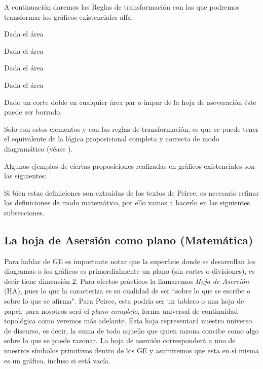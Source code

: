 \documentclass[
	fontsize=10pt, %
	twoside=false, %
	secnumdepth=1, %
	abstract=true, %
]{kaohandt}
\begin{document}
A continuación daremos las Reglas de transformación con las que podremos transformar los gráficos existenciales alfa:

\begin{definition}
	Dada el área
\end{definition}

\begin{definition}
	Dada el área
\end{definition}

\begin{definition}
	Dada el área
\end{definition}

\begin{definition}
	Dada el área
\end{definition}

\begin{definition}
	Dado un corte doble en cualquier área par o impar de la hoja de aseveración éste puede ser borrado.
\end{definition}

Solo con estos elementos y con las reglas de transformación, es que se puede tener el equivalente de la lógica proposicional completa y correcta de modo diagramático (véase ).

Algunos ejemplos de ciertas proposiciones realizadas en gráficos existenciales son las siguientes:



Si bien estas definiciones son extraídas de los textos de Peirce, es necesario refinar las definiciones de modo matemático, por ello vamos a hacerlo en las siguientes subsecciones.


\subsection{La hoja de Asersión como plano (Matemática)}

Para hablar de GE es importante notar que la superficie donde se desarrollan los diagramas o los gráficos es primordialmente un plano (sin cortes o divisiones), es decir tiene dimensión 2. Para efectos prácticos la llamaremos \textit{Hoja de Aserción} (HA), pues lo que la caracteriza es su cualidad de ser ``sobre lo que se escribe o sobre lo que se afirma". Para Peirce, esta podría ser un tablero o una hoja de papel; para nosotros será el \emph{plano complejo}, forma universal de continuidad topológica como veremos más adelante. Esta hoja representará nuestro universo de discurso, es decir, la suma de todo aquello que quien razona concibe como algo sobre lo que se puede razonar. La hoja de aserción corresponderá a uno de nuestros símbolos primitivos dentro de los GE y asumiremos que esta en sí misma es un gráfico, incluso si está vacía. 
\end{document}
